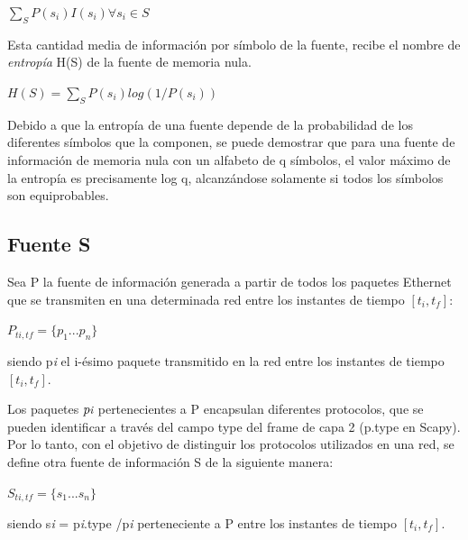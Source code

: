\documentclass[final,inline,narroweqnarray,a4paper]{ieee}
\begin{document}
\begin{center}
$\sum_{S} P(s_{i})I(s_{i}) \forall{s_{i}} \in{S}$
\end{center}

\begin{flushleft}
	Esta cantidad media de información por símbolo de la fuente, recibe el nombre de \textit{entropía} H(S) de la fuente de memoria nula.
\end{flushleft}

\begin{center}
	$H(S) =\sum_{S} P(s_{i})log(1/P(s_{i}))$ 

\end{center}
	
Debido a que la entropía de una fuente depende de la probabilidad de los diferentes símbolos que la componen, se puede demostrar que para una fuente de información de memoria nula con un alfabeto de q símbolos, el valor máximo de la entropía es precisamente log q, alcanzándose solamente si todos los símbolos son equiprobables.


\subsection{Fuente S} \label{ssec:fuenteS}

Sea P la fuente de información generada a partir de todos los paquetes Ethernet que se transmiten en una determinada red entre los instantes de tiempo $[t_{i}, t_{f}]$:

	$P_{ti,tf} = \{p_{1}...p_{n}\}$ 

\begin{flushleft}
	siendo p{\scriptsize \textit{i}} el i-ésimo paquete transmitido en la red entre los instantes de tiempo $[t_{i},t_{f}]$.
\end{flushleft}

Los paquetes $p{\scriptsize \textit{i}}$ pertenecientes a P encapsulan diferentes protocolos, que se pueden identificar a través del campo type del frame de capa 2 (p.type en Scapy). Por lo tanto, con el objetivo de distinguir los protocolos utilizados en una red, se define otra fuente de información S de la siguiente manera:

$S_{ti,tf} = \{s_{1}...s_{n}\}$ 

\begin{flushleft}
	siendo s{\scriptsize \textit{i}} = p{\scriptsize \textit{i}}.type /p{\scriptsize \textit{i}} perteneciente a P entre los instantes de tiempo $[t_{i},t_{f}]$.
\end{flushleft}
\end{document}
